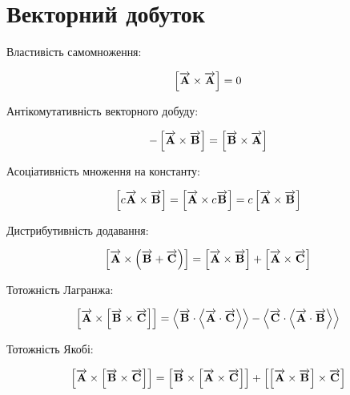 \section{Векторний добуток}

Властивість самомноження:

\begin{equation*} 
\crossprod{\vect{A}}{\vect{A}} = 0
\end{equation*}

Антікомутативність векторного добуду:

\begin{equation*} 
- \crossprod{\vect{A}}{\vect{B}} = \crossprod{\vect{B}}{\vect{A}}
\end{equation*}

Асоціативність множення на константу:

\begin{equation*} 
\crossprod{c \vect{A}}{\vect{B}} = \crossprod{\vect{A}}{c \vect{B}} =
c \crossprod{\vect{A}}{\vect{B}}
\end{equation*}

Дистрибутивність додавання:

\begin{equation*} 
\crossprod{\vect{A}}{ \left( \vect{B} + \vect{C} \right) } = 
\crossprod{\vect{A}}{\vect{B}} + \crossprod{\vect{A}}{\vect{C}}
\end{equation*}

Тотожність Лагранжа:

\begin{equation*}
\crossprod{\vect{A}}{\crossprod{\vect{B}}{\vect{C}}} =
\dotprod{\vect{B}}{\dotprod{\vect{A}}{\vect{C}}} - 
\dotprod{\vect{C}}{\dotprod{\vect{A}}{\vect{B}}}
\end{equation*}

Тотожність Якобі:

\begin{equation*}
\crossprod{\vect{A}}{\crossprod{\vect{B}}{\vect{C}}} =
\crossprod{\vect{B}}{\crossprod{\vect{A}}{\vect{C}}} +
\crossprod{\crossprod{\vect{A}}{\vect{B}}}{\vect{C}} 
\end{equation*}
